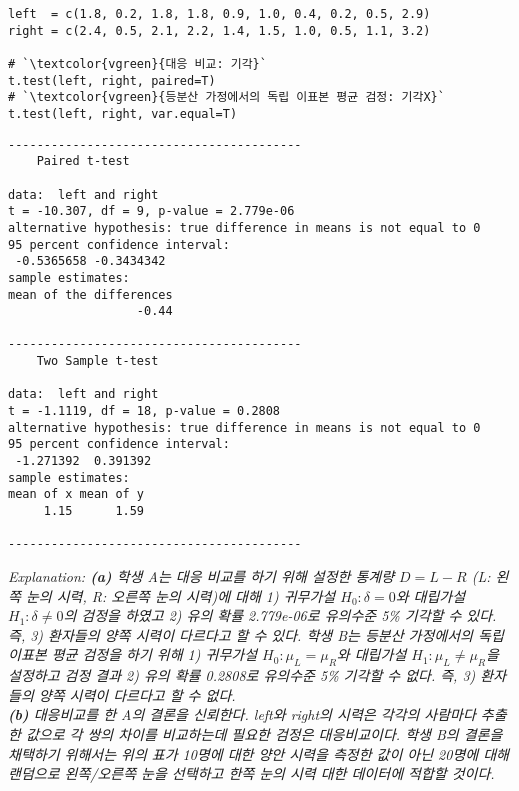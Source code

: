 \documentclass{article}
\begin{document}
\begin{lstlisting}[style={r-style}]
left  = c(1.8, 0.2, 1.8, 1.8, 0.9, 1.0, 0.4, 0.2, 0.5, 2.9)
right = c(2.4, 0.5, 2.1, 2.2, 1.4, 1.5, 1.0, 0.5, 1.1, 3.2)

# `\textcolor{vgreen}{대응 비교: 기각}`
t.test(left, right, paired=T)
# `\textcolor{vgreen}{등분산 가정에서의 독립 이표본 평균 검정: 기각X}`
t.test(left, right, var.equal=T)
\end{lstlisting}
\begin{lstlisting}[style={out-style}]
-----------------------------------------
	Paired t-test

data:  left and right
t = -10.307, df = 9, p-value = 2.779e-06
alternative hypothesis: true difference in means is not equal to 0
95 percent confidence interval:
 -0.5365658 -0.3434342
sample estimates:
mean of the differences 
                  -0.44 

-----------------------------------------
	Two Sample t-test

data:  left and right
t = -1.1119, df = 18, p-value = 0.2808
alternative hypothesis: true difference in means is not equal to 0
95 percent confidence interval:
 -1.271392  0.391392
sample estimates:
mean of x mean of y 
     1.15      1.59 

-----------------------------------------
\end{lstlisting}
\emph{Explanation: \textbf{(a)} 학생 A는 대응 비교를 하기 위해 설정한 통계량 $D = L-R$ (L: 왼쪽 눈의 시력, R: 오른쪽 눈의 시력)에 대해 1) 귀무가설 $H_0: \delta=0$와 대립가설 $H_1: \delta\neq0$의 검정을 하였고 2) 유의 확률 2.779e-06로 유의수준 5\%  기각할 수 있다. 즉, 3) 환자들의 양쪽 시력이 다르다고 할 수 있다. 학생 B는 등분산 가정에서의 독립 이표본 평균 검정을 하기 위해 1) 귀무가설 $H_0: \mu_L=\mu_R$와 대립가설 $H_1: \mu_L\neq\mu_R$을 설정하고 검정 결과 2) 유의 확률 0.2808로 유의수준 5\%  기각할 수 없다. 즉, 3) 환자들의 양쪽 시력이 다르다고 할 수 없다.\\
\textbf{(b)} 대응비교를 한 A의 결론을 신뢰한다. left와 right의 시력은 각각의 사람마다 추출한 값으로 각 쌍의 차이를 비교하는데 필요한 검정은 대응비교이다. 학생 B의 결론을 채택하기 위해서는 위의 표가 10명에 대한 양안 시력을 측정한 값이 아닌 20명에 대해 랜덤으로 왼쪽/오른쪽 눈을 선택하고 한쪽 눈의 시력 대한 데이터에 적합할 것이다. } \\
\end{document}
